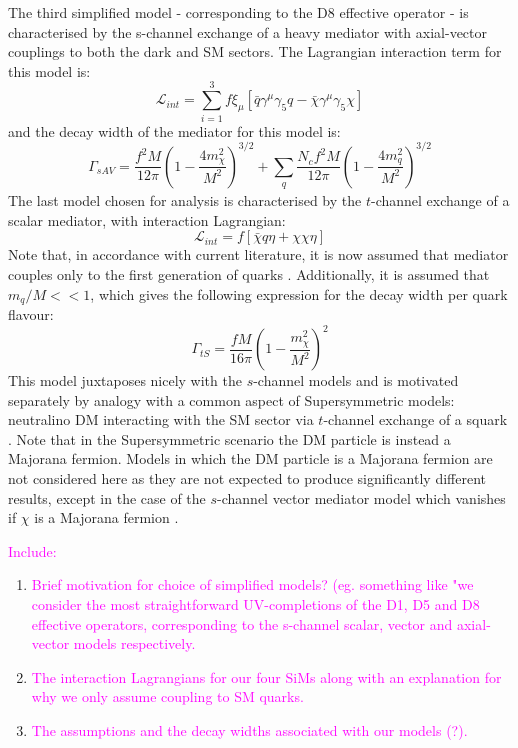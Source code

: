 \begin{flushleft}
The third simplified model - corresponding to the D8 effective operator - is characterised by the s-channel exchange of a heavy mediator with axial-vector couplings to both the dark and SM sectors. The Lagrangian interaction term for this model is:
\begin{equation}
\label{L_int_sAV}
\mathcal{L}_{int} = \sum\limits_{i=1}^{3} f\xi_{\mu} \left[\bar{q}\gamma^{\mu}\gamma_{5}q - \bar{\chi}\gamma^{\mu}\gamma_{5}\chi\right]
\end{equation}
and the decay width of the mediator for this model is:
\begin{equation}
\label{gamma_sAV}
\Gamma_{sAV} = \frac{f^{2} M}{12\pi}\left(1 - \frac{4m_{\chi}^{2}}{M^{2}}\right)^{3/2} + \sum_{\substack{q}}\frac{N_{c}f^{2} M}{12\pi}\left(1 - \frac{4m_{q}^{2}}{M^{2}}\right)^{3/2}
\end{equation}
The last model chosen for analysis is characterised by the $t$-channel exchange of a scalar mediator, with interaction Lagrangian:
\begin{equation}
\label{L_int_tS}
\mathcal{L}_{int} = f \left[\bar{\chi}q\eta + \chi\chi\eta\right]
\end{equation}
Note that, in accordance with current literature, it is now assumed that mediator couples only to the first generation of quarks \cite{t-channel}. Additionally, it is assumed that $m_{q}/M << 1$, which gives the following expression for the decay width per quark flavour: 
\begin{equation}
\label{gamma_tS}
\Gamma_{tS} = \frac{f M}{16\pi}\left(1 - \frac{m_{\chi}^{2}}{M^{2}}\right)^{2}
\end{equation}
This model juxtaposes nicely with the $s$-channel models and is motivated separately by analogy with a common aspect of Supersymmetric models: neutralino DM interacting with the SM sector via $t$-channel exchange of a squark \cite{SUSYDM}. Note that in the Supersymmetric scenario the DM particle is instead a Majorana fermion. Models in which the DM particle is a Majorana fermion are not considered here as they are not expected to produce significantly different results, except in the case of the $s$-channel vector mediator model which vanishes if $\chi$ is a Majorana fermion \cite{METSig}.
\bigskip

\textcolor{magenta}{Include:}
\begin{enumerate}
\item \textcolor{magenta}{Brief motivation for choice of simplified models? (eg. something like "we consider the most straightforward UV-completions of the D1, D5 and D8 effective operators, corresponding to the s-channel scalar, vector and axial-vector models respectively.}
\item \textcolor{magenta}{The interaction Lagrangians for our four SiMs along with an explanation for why we only assume coupling to SM quarks.}
\item \textcolor{magenta}{The assumptions and the decay widths associated with our models (?).}
\end{enumerate}
\end{flushleft}

